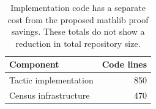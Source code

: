 \begin{table}[!htbp]\centering\small
\caption{Implementation code has a separate cost from the proposed mathlib proof savings. These totals do not show a reduction in total repository size.}
\begin{tabular}{lr}\toprule
Component & Code lines\\\midrule
Tactic implementation & 850\\
Census infrastructure & 470\\
\bottomrule\end{tabular}\end{table}
